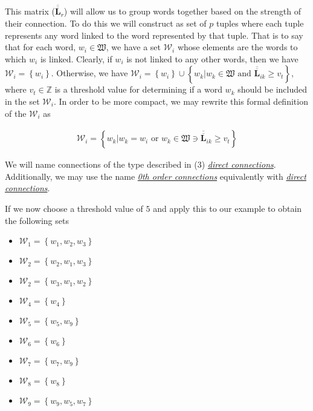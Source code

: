 \documentclass{article}[12pt]
\newcommand{\Z}{\mathbb{Z}}
\newcommand{\mat}[1]{\overline{\overline{\mathbf{#1}}}}
\begin{document}
\begin{flushleft}
This matrix ($\mat{L}_r$) will allow us to group words together based on the strength of their connection.  To do this we will construct as set of $p$ tuples where each tuple represents any word linked to the word represented by that tuple.  That is to say that for each word, $w_i \in \mathfrak{W}$, we have a set $\mathcal{W}_i$ whose elements are the words to which $w_i$ is linked.  Clearly, if $w_i$ is not linked to any other words, then we have $\mathcal{W}_i = \left\{ w_i \right\}$. Otherwise, we have $\mathcal{W}_i = \left\{ w_i \right\} \cup \left\{ w_k | w_k \in \mathfrak{W} \text{ and } \mat{L}_{ik} \geq v_{t} \right\}$, where $v_{t} \in \Z$ is a threshold value for determining if a word $w_k$ should be included in the set $\mathcal{W}_i$. In order to be more compact, we may rewrite this formal definition of the $\mathcal{W}_i$ as

\begin{align}
\mathcal{W}_i = \left\{ w_k | w_k = w_i \text{ or } w_k \in \mathfrak{W} \ni \mat{L}_{ik} \geq v_{t} \right\}
\end{align}

We will name connections of the type described in (3) \underline{\emph{direct connections}}.  Additionally, we may use the name \underline{\emph{0th order connections}} equivalently with \underline{\emph{direct connections}}. \newline

If we now choose a threshold value of $5$ and apply this to our example to obtain the following sets

\begin{multicols}{3}
	\begin{itemize}
		\item $\mathcal{W}_1 = \left\{ w_1, w_2, w_3 \right\}$
		\item $\mathcal{W}_2 = \left\{ w_2, w_1, w_3 \right\}$
		\item $\mathcal{W}_2 = \left\{ w_3, w_1, w_2 \right\}$
		\item $\mathcal{W}_4 = \left\{ w_4 \right\}$
		\item $\mathcal{W}_5 = \left\{ w_5, w_9 \right\}$
		\item $\mathcal{W}_6 = \left\{ w_6 \right\}$
		\item $\mathcal{W}_7 = \left\{ w_7, w_9 \right\}$
		\item $\mathcal{W}_8 = \left\{ w_8 \right\}$
		\item $\mathcal{W}_9 = \left\{ w_9, w_5, w_7 \right\}$
	\end{itemize}
\end{multicols}


\end{flushleft}
\end{document}
